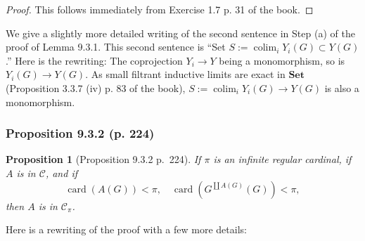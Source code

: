 \documentclass[12pt]{article}%
\newtheorem{prop}[thm]{Proposition}
\theoremstyle{remark}
\theoremstyle{definition}
\newcommand{\C}{\mathcal C}
\newcommand{\Set}{\mathbf{Set}}
\DeclareMathOperator*{\colim}{colim}
\DeclareMathOperator{\card}{card}%
\begin{document}
\begin{proof}
This follows immediately from Exercise 1.7 p. 31 of the book.
\end{proof}

We give a slightly more detailed writing of the second sentence in Step (a) of the proof of Lemma 9.3.1. This second sentence is ``Set $S:=\colim_iY_i(G)\subset Y(G)$.'' Here is the rewriting: The coprojection $Y_i\to Y$ being a monomorphism, so is $Y_i(G)\to Y(G)$. As small filtrant inductive limits are exact in $\Set$ (Proposition 3.3.7 (iv) p. 83 of the book), $S:=\colim_iY_i(G)\to Y(G)$ is also a monomorphism.

%

\subsubsection{Proposition 9.3.2 (p. 224)}

\begin{prop}[Proposition 9.3.2 p.~224]\label{932}
If $\pi$ is an infinite regular cardinal, if $A$ is in $\C$, and if 
$$
\card(A(G))<\pi,\quad\card(G^{\coprod A(G)}(G))<\pi,
$$ 
then $A$ is in $\C_\pi$.
\end{prop}

Here is a rewriting of the proof with a few more details:
\end{document}
